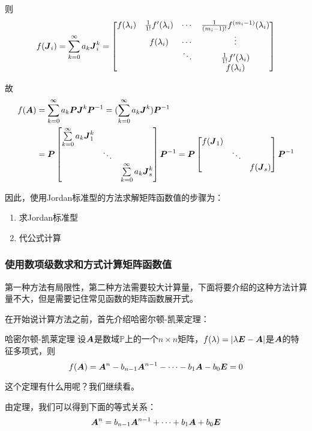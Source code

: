 \documentclass[12pt, a4paper, oneside, UTF8]{ctexbook}
\begin{document}
则\[f(\boldsymbol{J}_i)=\sum_{k=0}^{\infty}a_k\boldsymbol{J}_i^k=\begin{bmatrix}
    f(\lambda_i)&\frac{1}{1!}f'(\lambda_i)&\cdots&\frac{1}{(m_i-1)!}f^{(m_i-1)}(\lambda_i)\\
    &f(\lambda_i)&\cdots&\vdots\\
    &&\ddots&\frac{1}{1!}f'(\lambda_i)\\
    &&&f(\lambda_i)
\end{bmatrix}\]

故\[
\begin{aligned}
    f(\boldsymbol{A})&=\sum_{k=0}^{\infty}a_k\boldsymbol{P}\boldsymbol{J}^k\boldsymbol{P}^{-1}=(\sum_{k=0}^{\infty}a_k\boldsymbol{J}^k)\boldsymbol{P}^{-1}\\
    &=\boldsymbol{P}\begin{bmatrix}
        \sum\limits_{k=0}^{\infty}a_k\boldsymbol{J}^k_1&&\\
        &\ddots&\\
        &&\sum\limits_{k=0}^{\infty}a_k\boldsymbol{J}^k_s
    \end{bmatrix}\boldsymbol{P}^{-1}=\boldsymbol{P}\begin{bmatrix}
        f(\boldsymbol{J}_1)&&\\
        &\ddots&\\
        &&f(\boldsymbol{J}_s)
    \end{bmatrix}\boldsymbol{P}^{-1}
\end{aligned}
\]

因此，使用Jordan标准型的方法求解矩阵函数值的步骤为：
\begin{enumerate}[leftmargin=4em]
    \item 求Jordan标准型
    \item 代公式计算
\end{enumerate}
\subsubsection{使用数项级数求和方式计算矩阵函数值}
第一种方法有局限性，第二种方法需要较大计算量，下面将要介绍的这种方法计算量不大，但是需要记住常见函数的矩阵函数展开式。

在开始说计算方法之前，首先介绍哈密尔顿-凯莱定理：
\begin{them}{哈密尔顿-凯莱定理}{}
    设$\boldsymbol{A}$是数域$\mathbb{P} $上的一个$n\times n$矩阵，$f(\lambda)=|\lambda\boldsymbol{E}-\boldsymbol{A}|$是$\boldsymbol{A}$的特征多项式，则\[f(\boldsymbol{A})=\boldsymbol{A}^n-b_{n-1}\boldsymbol{A}^{n-1}-\cdots-b_1\boldsymbol{A}-b_0\boldsymbol{E}=0\]
\end{them}

这个定理有什么用呢？我们继续看。

由定理，我们可以得到下面的等式关系：
\[\boldsymbol{A}^n=b_{n-1}\boldsymbol{A}^{n-1}+\cdots+b_1\boldsymbol{A}+b_0\boldsymbol{E}\]
\end{document}
